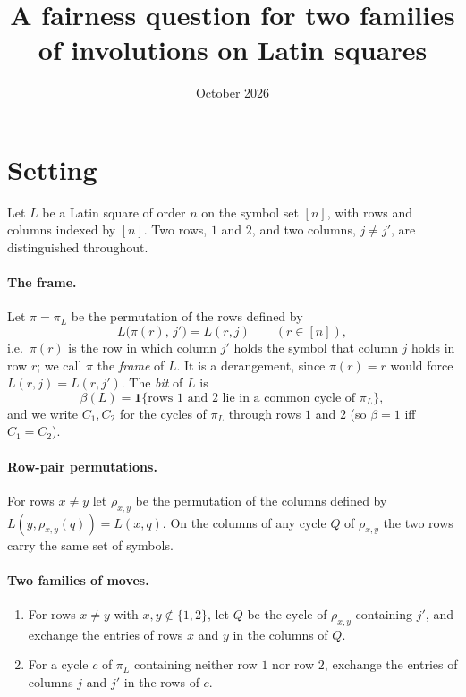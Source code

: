 \documentclass[11pt]{amsart}
\title{A fairness question for two families of involutions on Latin squares}
\author{}
\date{October 2026}
\theoremstyle{remark}
\begin{document}
\maketitle

\section*{Setting}

Let $L$ be a Latin square of order $n$ on the symbol set $[n]$, with
rows and columns indexed by $[n]$.  Two rows, $1$ and $2$, and two
columns, $j\ne j'$, are distinguished throughout.

\paragraph{The frame.}  Let $\pi=\pi_L$ be the permutation of the
rows defined by
\[
L\bigl(\pi(r),\,j'\bigr)=L(r,j)\qquad(r\in[n]),
\]
i.e.\ $\pi(r)$ is the row in which column $j'$ holds the symbol that
column $j$ holds in row $r$; we call $\pi$ the \emph{frame} of $L$.
It is a derangement, since $\pi(r)=r$ would force
$L(r,j)=L(r,j')$.  The \emph{bit} of $L$ is
\[
\beta(L)=\mathbf 1\{\text{rows $1$ and $2$ lie in a common cycle of }\pi_L\},
\]
and we write $C_1,C_2$ for the cycles of $\pi_L$ through rows $1$ and
$2$ (so $\beta=1$ iff $C_1=C_2$).

\paragraph{Row-pair permutations.}  For rows $x\ne y$ let
$\rho_{x,y}$ be the permutation of the columns defined by
$L(y,\rho_{x,y}(q))=L(x,q)$.  On the columns of any cycle $Q$ of
$\rho_{x,y}$ the two rows carry the same set of symbols.

\paragraph{Two families of moves.}
\begin{enumerate}[leftmargin=2.2em]
\item[(\textsc{trade})] For rows $x\ne y$ with $x,y\notin\{1,2\}$,
let $Q$ be the cycle of $\rho_{x,y}$ containing $j'$, and exchange the
entries of rows $x$ and $y$ in the columns of $Q$.
\item[(\textsc{turn})] For a cycle $c$ of $\pi_L$ containing neither
row $1$ nor row $2$, exchange the entries of columns $j$ and $j'$ in
the rows of $c$.
\end{enumerate}
\end{document}
